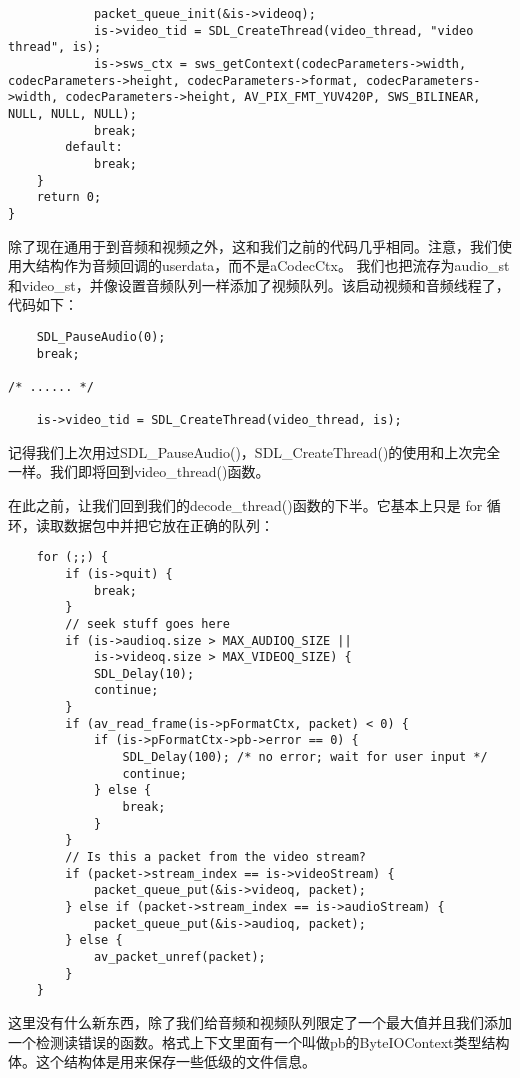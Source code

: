 \begin{lstlisting}
            packet_queue_init(&is->videoq);
            is->video_tid = SDL_CreateThread(video_thread, "video thread", is);
            is->sws_ctx = sws_getContext(codecParameters->width, codecParameters->height, codecParameters->format, codecParameters->width, codecParameters->height, AV_PIX_FMT_YUV420P, SWS_BILINEAR, NULL, NULL, NULL);
            break;
        default:
            break;
    }
    return 0;
}
\end{lstlisting}

除了现在通用于到音频和视频之外，这和我们之前的代码几乎相同。注意，我们使用大结构作为音频回调的userdata，而不是aCodecCtx。 我们也把流存为audio_st和video_st，并像设置音频队列一样添加了视频队列。该启动视频和音频线程了，代码如下：


\begin{lstlisting}
    SDL_PauseAudio(0);
    break;

/* ...... */

    is->video_tid = SDL_CreateThread(video_thread, is);
\end{lstlisting}

记得我们上次用过SDL_PauseAudio()，SDL_CreateThread()的使用和上次完全一样。我们即将回到video_thread()函数。

在此之前，让我们回到我们的decode_thread()函数的下半。它基本上只是 for 循环，读取数据包中并把它放在正确的队列：
\begin{lstlisting}
    for (;;) {
        if (is->quit) {
            break;
        }
        // seek stuff goes here
        if (is->audioq.size > MAX_AUDIOQ_SIZE ||
            is->videoq.size > MAX_VIDEOQ_SIZE) {
            SDL_Delay(10);
            continue;
        }
        if (av_read_frame(is->pFormatCtx, packet) < 0) {
            if (is->pFormatCtx->pb->error == 0) {
                SDL_Delay(100); /* no error; wait for user input */
                continue;
            } else {
                break;
            }
        }
        // Is this a packet from the video stream?
        if (packet->stream_index == is->videoStream) {
            packet_queue_put(&is->videoq, packet);
        } else if (packet->stream_index == is->audioStream) {
            packet_queue_put(&is->audioq, packet);
        } else {
            av_packet_unref(packet);
        }
    }
\end{lstlisting}

这里没有什么新东西，除了我们给音频和视频队列限定了一个最大值并且我们添加一个检测读错误的函数。格式上下文里面有一个叫做pb的ByteIOContext类型结构体。这个结构体是用来保存一些低级的文件信息。

